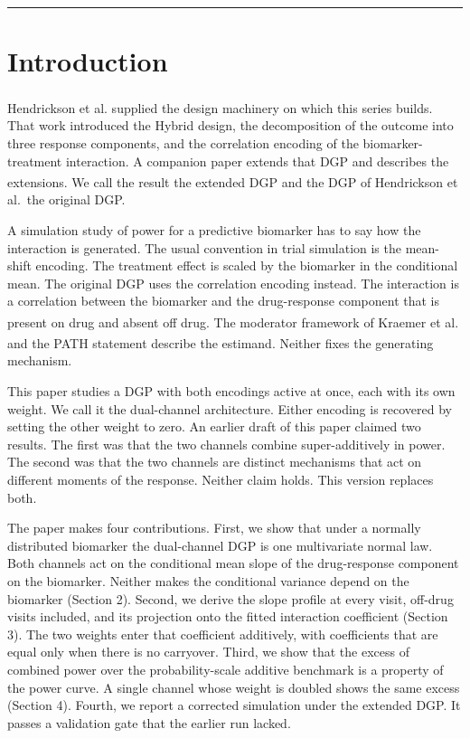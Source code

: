 \documentclass[
  11pt,
]{article}
\begin{document}
\bigskip\noindent

\rule{\textwidth}{0.4pt}\bigskip

\section{Introduction}\label{introduction}

Hendrickson et al.\textsuperscript{} supplied the design machinery
on which this series builds. That work introduced the Hybrid design,
the decomposition of the outcome into three response components, and
the correlation encoding of the biomarker-treatment interaction. A
companion paper extends that DGP and describes the extensions\textsuperscript{}. We call the result the extended DGP and the
DGP of Hendrickson et al.~the original DGP.

A simulation study of power for a predictive biomarker has to say
how the interaction is generated. The usual convention in trial
simulation is the mean-shift encoding. The treatment effect is
scaled by the biomarker in the conditional mean. The original DGP
uses the correlation encoding instead. The interaction is a
correlation between the biomarker and the drug-response component
that is present on drug and absent off drug. The moderator framework
of Kraemer et al.\textsuperscript{} and the PATH statement\textsuperscript{} describe the estimand. Neither fixes the generating
mechanism.

This paper studies a DGP with both encodings active at once, each
with its own weight. We call it the dual-channel architecture. Either
encoding is recovered by setting the other weight to zero. An earlier
draft of this paper claimed two results. The first was that the two
channels combine super-additively in power. The second was that the
two channels are distinct mechanisms that act on different moments of
the response. Neither claim holds. This version replaces both.

The paper makes four contributions. First, we show that under a
normally distributed biomarker the dual-channel DGP is one
multivariate normal law. Both channels act on the conditional mean
slope of the drug-response component on the biomarker. Neither makes
the conditional variance depend on the biomarker (Section 2). Second,
we derive the slope profile at every visit, off-drug visits
included, and its projection onto the fitted interaction coefficient
(Section 3). The two weights enter that coefficient additively, with
coefficients that are equal only when there is no carryover. Third,
we show that the excess of combined power over the
probability-scale additive benchmark is a property of the power
curve. A single channel whose weight is doubled shows the same excess
(Section 4). Fourth, we report a corrected simulation under the
extended DGP. It passes a validation gate that the earlier run lacked.
\end{document}
